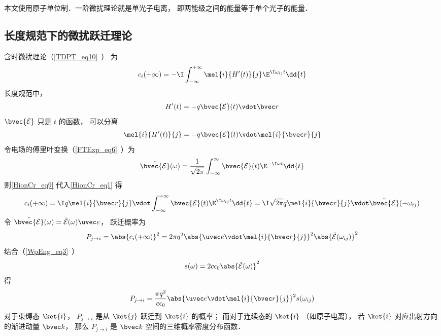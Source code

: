
\begin{issues}
\issueDraft
\end{issues}


本文使用原子单位制．一阶微扰理论就是单光子电离， 即两能级之间的能量等于单个光子的能量．

\subsection{长度规范下的微扰跃迁理论}
含时微扰理论（\autoref{TDPT_eq10}~） 为
\begin{equation}\label{HionCr_eq1}
c_i(+\infty) = -\I \int_{-\infty}^{+\infty} \mel{i}{H'(t)}{j} \E^{\I\omega_{ij} t} \dd{t}
\end{equation}
长度规范中，
\begin{equation}
H'(t) = -q\bvec {\mathcal E}(t) \vdot \bvec r
\end{equation}
$\bvec {\mathcal E}$ 只是 $t$ 的函数， 可以分离
\begin{equation}\label{HionCr_eq9}
\mel{i}{H'(t)}{j} = -q\bvec {\mathcal E}(t) \vdot \mel{i}{\bvec r}{j}
\end{equation}
令电场的傅里叶变换（\autoref{FTExp_eq6}~）为
\begin{equation}
\tilde {\bvec {\mathcal E}}(\omega) = \frac{1}{\sqrt{2\pi}} \int_{-\infty}^{\infty} \bvec {\mathcal E}(t) \E^{-\I\omega t} \dd{t}
\end{equation}
则\autoref{HionCr_eq9} 代入\autoref{HionCr_eq1} 得
\begin{equation}\label{HionCr_eq7}
c_i(+\infty) = \I q \mel{i}{\bvec r}{j} \vdot \int_{-\infty}^{+\infty} \bvec {\mathcal E}(t) \E^{\I\omega_{ij} t} \dd{t} = \I \sqrt{2\pi} q \mel{i}{\bvec r}{j} \vdot \tilde {\bvec {\mathcal E}}(-\omega_{ij})
\end{equation}
令 $\tilde {\bvec {\mathcal E}}(\omega) = \tilde {{\mathcal E}}(\omega)\uvec e$， 跃迁概率为
\begin{equation}\label{HionCr_eq2}
P_{j\to i} = \abs{c_i(+\infty)}^2 = 2\pi q^2 \abs{\uvec e \vdot \mel{i}{\bvec r}{j}}^2 \abs{\tilde {{\mathcal E}}(\omega_{ij})}^2
\end{equation}
结合（\autoref{WpEng_eq3}~）
\begin{equation}\label{HionCr_eq8}
s(\omega) = 2c\epsilon_0 \abs{\tilde {{\mathcal E}}(\omega)}^2
\end{equation}
得
\begin{equation}\label{HionCr_eq6}
P_{j\to i} = \frac{\pi q^2}{c\epsilon_0} \abs{\uvec e \vdot\mel{i}{\bvec r}{j}}^2 s(\omega_{ij})
\end{equation}
对于束缚态 $\ket{i}$， $P_{j\to i}$ 是从 $\ket{j}$ 跃迁到 $\ket{i}$ 的概率； 而对于连续态的 $\ket{i}$ （如原子电离）， 若 $\ket{i}$ 对应出射方向的渐进动量 $\bvec k$， 那么 $P_{j\to i}$ 是 $\bvec k$ 空间的三维概率密度分布函数．

